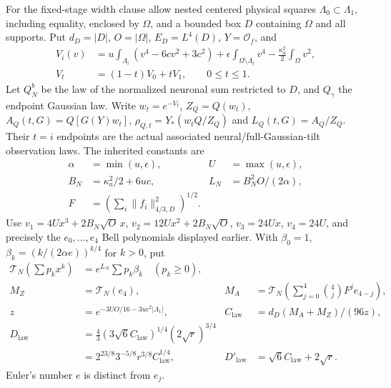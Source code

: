 For the fixed-stage width clause allow nested centered physical squares
$\Lambda_0\subset\Lambda_1$, including equality, enclosed by $\Omega$,
and a bounded box $D$ containing $\Omega$ and all supports.
Put $d_D=|D|$, $O=|\Omega|$, $E_D=L^4(D)$, $Y=\mathcal O_f$, and
\begin{align*}
 V_i(v)&=u\int_{\Lambda_i}(v^4-6cv^2+3c^2)
       +\epsilon\int_{\Omega\setminus\Lambda_i}v^4
       -\frac{\kappa_a^2}{2}\int_\Omega v^2,\\
 V_t&=(1-t)V_0+tV_1,\qquad0\le t\le1.
\end{align*}
Let $Q_N^b$ be the law of the normalized neuronal sum restricted to $D$,
and $Q_\gamma$ the endpoint Gaussian law. Write
$w_t=e^{-V_t}$, $Z_Q=Q(w_t)$,
$A_Q(t,G)=Q[G(Y)w_t]$, $\rho_{Q,t}=Y_*(w_tQ/Z_Q)$ and
$L_Q(t,G)=A_Q/Z_Q$. Their $t=i$ endpoints are the actual associated
neural/full-Gaussian-tilt observation laws. The inherited constants are
\begin{align*}
 \alpha&=\min(u,\epsilon),&U&=\max(u,\epsilon),\\
 B_N&=\kappa_a^2/2+6uc,&L_N&=B_N^2O/(2\alpha),\\
 F&=\left(\sum_i\|f_i\|_{4/3,D}^2\right)^{1/2}.
\end{align*}
Use $v_1=4Ux^3+2B_N\sqrt O\,x$, $v_2=12Ux^2+2B_N\sqrt O$,
$v_3=24Ux$, $v_4=24U$, and precisely the $e_0,\ldots,e_4$ Bell
polynomials displayed earlier. With $\beta_0=1$,
$\beta_k=(k/(2\alpha e))^{k/4}$ for $k>0$, put
\begin{align*}
 \mathcal T_N\left(\sum p_kx^k\right)&=e^{L_N}\sum p_k\beta_k\quad(p_k\ge0),\\
 M_Z&=\mathcal T_N(e_4),&
 M_A&=\mathcal T_N\left(\sum_{j=0}^4\binom4jF^je_{4-j}\right),\\
 z&=e^{-3UO/16-3uc^2|\Lambda_1|},&
 C_{\mathrm{law}}&=d_D(M_A+M_Z)/(96z),\\
 D_{\mathrm{law}}&=\tfrac43(3\sqrt6C_{\mathrm{law}})^{1/4}(2\sqrt r)^{3/4}\\
 &=2^{23/8}3^{-5/8}r^{3/8}C_{\mathrm{law}}^{1/4},&
 D'_{\mathrm{law}}&=\sqrt6C_{\mathrm{law}}+2\sqrt r.
\end{align*}
Euler's number $e$ is distinct from $e_j$.

